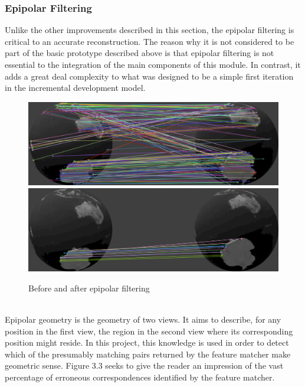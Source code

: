 \documentclass[12pt,a4paper,twoside,openright]{report}
\begin{document}
\subsubsection{Epipolar Filtering}
Unlike the other improvements described in this section, the epipolar filtering is critical to an accurate reconstruction. The reason why it is not considered to be part of the basic prototype described above is that epipolar filtering is not essential to the integration of the main components of this module. In contrast, it adds a great deal complexity to what was designed to be a simple first iteration in the incremental development model.\\
\begin{figure}
\begin{center}
\includegraphics[scale=0.35]{figs/before_epi.png} \\
\vspace{5pt}
\includegraphics[scale=0.35]{figs/after_epi.png}	
\caption{Before and after epipolar filtering}
\end{center}
\end{figure}\\
Epipolar geometry is the geometry of two views. It aims to describe, for any position in the first view, the region in the second view where its corresponding position might reside. In this project, this knowledge is used in order to detect which of the presumably matching pairs returned by the feature matcher make geometric sense. Figure 3.3 seeks to give the reader an impression of the vast percentage of erroneous correspondences identified by the feature matcher.\\
\end{document}
